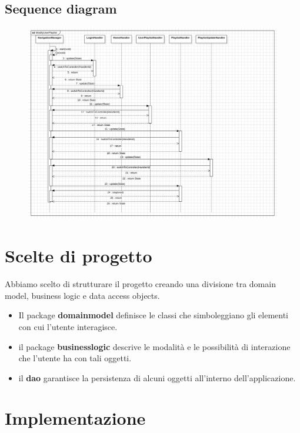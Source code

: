 \documentclass{article}
\begin{document}
  \subsection{Sequence diagram}
  \begin{figure}[H]
    \includegraphics[scale=0.30]{sequenze01}
  \end{figure}

  \section{Scelte di progetto}

  Abbiamo scelto di strutturare il progetto creando una divisione tra domain model, business logic e data
  access objects.
  \begin{itemize}
    \item
    Il package  \textbf{domainmodel} definisce le classi che simboleggiano gli elementi con cui l'utente
    interagisce.
    \item
    il package \textbf{businesslogic} descrive le modalità e le possibilità di interazione che l'utente
    ha con tali oggetti.
    \item
    il \textbf{dao} garantisce la persistenza di alcuni oggetti all'interno dell'applicazione.

  \end{itemize}


  \section{Implementazione}
\end{document}
